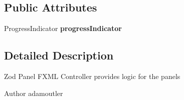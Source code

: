 \subsection*{Public Attributes}
\begin{DoxyCompactItemize}
\item 
\hypertarget{classcom_1_1casual__dev_1_1zodui_1_1contentpanel_1_1_zod_panel_controller_ac5aa933f79d7d574e7247af9c5256985}{Progress\-Indicator {\bfseries progress\-Indicator}}\label{classcom_1_1casual__dev_1_1zodui_1_1contentpanel_1_1_zod_panel_controller_ac5aa933f79d7d574e7247af9c5256985}

\end{DoxyCompactItemize}


\subsection{Detailed Description}
Zod Panel F\-X\-M\-L Controller provides logic for the panels \begin{DoxyAuthor}{Author}
adamoutler 
\end{DoxyAuthor}


